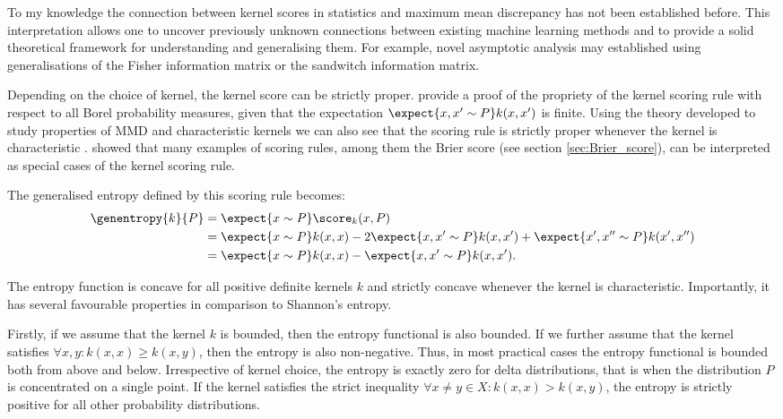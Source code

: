 To my knowledge the connection between kernel scores in statistics and maximum mean discrepancy has not been established before. This interpretation allows one to uncover previously unknown connections between existing machine learning methods and to provide a solid theoretical framework for understanding and generalising them. For example, novel asymptotic analysis may established using generalisations of the Fisher information matrix or the sandwitch information matrix.

Depending on the choice of kernel, the kernel score can be strictly proper. \citet{Gneiting2007} provide a proof of the propriety of the kernel scoring rule with respect to all Borel probability measures, given that the expectation $\expect{x,x'\sim P} k(x,x')$ is finite. Using the theory developed to study properties of MMD and characteristic kernels we can also see that the scoring rule is strictly proper whenever the kernel is characteristic \citep{Sriperumbudur2008}. \citet{Gneiting2007} showed that many examples of scoring rules, among them the Brier score (see section \ref{sec:Brier_score}), can be interpreted as special cases of the kernel scoring rule.

The generalised entropy defined by this scoring rule becomes:
%
\begin{align}
	\genentropy{k}{P} &= \expect{x\sim P} \score_{k}(x,P) \\
		&= \expect{x\sim P} k(x,x) - 2 \expect{x,x'\sim P} k(x,x') + \expect{x',x''\sim P}k(x',x'')\\
		&= \expect{x\sim P} k(x,x) - \expect{x,x'\sim P} k(x,x').
\end{align}

The entropy function is concave for all positive definite kernels $k$ and strictly concave whenever the kernel is characteristic. Importantly, it has several favourable properties in comparison to Shannon's entropy.

Firstly, if we assume that the kernel $k$ is bounded, then the entropy functional is also bounded. If we further assume that the kernel satisfies $\forall x,y: k(x,x)\geq k(x,y)$, then the entropy is also non-negative. Thus, in most practical cases the entropy functional is bounded both from above and below. Irrespective of kernel choice, the entropy is exactly zero for delta distributions, that is when the distribution $P$ is concentrated on a single point. If the kernel satisfies the strict inequality $\forall x\neq y\in X: k(x,x) > k(x,y)$, the entropy is strictly positive for all other probability distributions.

